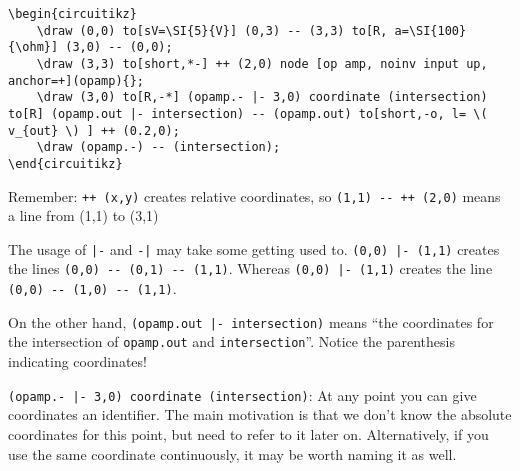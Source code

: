 \begin{lstlisting}
\begin{circuitikz}
    \draw (0,0) to[sV=\SI{5}{V}] (0,3) -- (3,3) to[R, a=\SI{100}{\ohm}] (3,0) -- (0,0);
    \draw (3,3) to[short,*-] ++ (2,0) node [op amp, noinv input up, anchor=+](opamp){};
    \draw (3,0) to[R,-*] (opamp.- |- 3,0) coordinate (intersection) to[R] (opamp.out |- intersection) -- (opamp.out) to[short,-o, l= \( v_{out} \) ] ++ (0.2,0);
    \draw (opamp.-) -- (intersection);
\end{circuitikz}
\end{lstlisting}    

Remember: \verb|++ (x,y)| creates relative coordinates, so \verb|(1,1) -- ++ (2,0)| means a line from (1,1) to (3,1)

The usage of \texttt{|-} and \texttt{-|} may take some getting used to.
\texttt{(0,0) |- (1,1)} creates the lines \verb|(0,0) -- (0,1) -- (1,1)|.
Whereas \texttt{(0,0) |- (1,1)} creates the line \verb|(0,0) -- (1,0) -- (1,1)|.

On the other hand, \verb!(opamp.out |- intersection)! means ``the coordinates for the intersection of \texttt{opamp.out} and \texttt{intersection}''. 
Notice the parenthesis indicating coordinates!

\verb!(opamp.- |- 3,0) coordinate (intersection)!: At any point you can give coordinates an identifier.
The main motivation is that we don't know the absolute coordinates for this point, but need to refer to it later on.
Alternatively, if you use the same coordinate continuously, it may be worth naming it as well.

